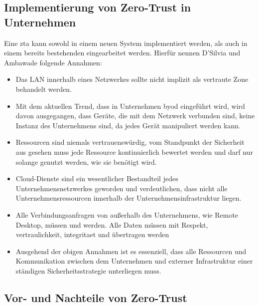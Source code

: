 \subsection{Implementierung von Zero-Trust in Unternehmen}\label{subsec:implementierung-von-zero-trust-in-unternehmen}
Eine \ac{zta} kann sowohl in einem neuen System implementiert werden, als auch in einem bereits bestehenden eingearbeitet werden.
Hierfür nennen D'Silvia und Ambawade\autocite[\vglf][]{dsilvia-2021} folgende Annahmen:
\begin{itemize}
    \item Das LAN innerhalb eines Netzwerkes sollte nicht implizit als vertraute Zone behandelt werden.
    \item Mit dem aktuellen Trend, dass in Unternehmen \ac{byod} eingeführt wird, wird davon ausgegangen, dass Geräte, die mit dem Netzwerk verbunden sind, keine Instanz des Unternehmens sind, da jedes Gerät manipuliert werden kann.
    \item Ressourcen sind niemals vertrauenswürdig, \dah vom Standpunkt der Sicherheit aus gesehen muss jede Ressource kontinuierlich bewertet werden und darf nur solange genutzt werden, wie sie benötigt wird.
    \item Cloud-Dienste sind ein wesentlicher Bestandteil jedes Unternehmensnetzwerkes geworden und verdeutlichen, dass nicht alle Unternehmensressourcen innerhalb der Unternehmensinfrastruktur liegen.
    \item Alle Verbindungsanfragen von außerhalb des Unternehmens, wie \zb Remote Desktop, müssen  und  werden.
    Alle Daten müssen mit Respekt, \gls{vertraulichkeit}, \gls{integritaet} und  übertragen werden
    \item Ausgehend der obigen Annahmen ist es essenziell, dass alle Ressourcen und Kommunikation zwischen dem Unternehmen und externer Infrastruktur einer ständigen Sicherheitsstrategie unterliegen muss.
\end{itemize}

\subsection{Vor- und Nachteile von Zero-Trust}\label{subsec:vor-und-nachteile-von-zero-trust}